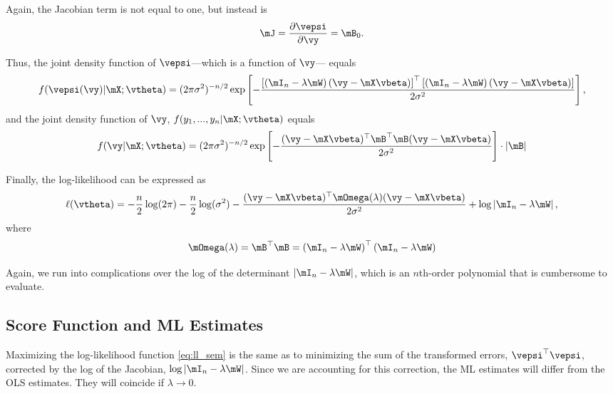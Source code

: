 Again, the Jacobian term is not equal to one, but instead is
\begin{equation*}
\mJ = \frac{\partial \vepsi}{\partial \vy} =\mB_0.
\end{equation*}

Thus, the joint density function of $\vepsi$---which is a function of $\vy$--- equals
\begin{equation*}
  f(\vepsi(\vy)| \mX ; \vtheta) = (2\pi \sigma^2)^{-n/2}\exp\left[- \frac{\left[\left(\mI_n-\lambda\mW\right)(\vy - \mX\vbeta)\right]^\top \left[\left(\mI_n-\lambda\mW\right)(\vy - \mX\vbeta)\right]}{2\sigma^2}\right],
\end{equation*}
%
and the joint density function of $\vy$, $f(y_1,...,y_n|\mX; \vtheta)$ equals
\begin{equation*}
  f(\vy| \mX ; \vtheta) = (2\pi \sigma^2)^{-n/2}\exp\left[- \frac{(\vy - \mX\vbeta)^\top \mB^\top \mB (\vy - \mX\vbeta)}{2\sigma^2}\right]\cdot \left|\mB\right|
\end{equation*}

Finally, the log-likelihood can be expressed as
\begin{equation}\label{eq:ll_sem}
\ell(\vtheta) = - \frac{n}{2}\log(2\pi) - \frac{n}{2}\log(\sigma^2)-\frac{(\vy - \mX\vbeta)^\top \mOmega(\lambda) (\vy - \mX\vbeta)}{2\sigma^2} + \log\left|\mI_n - \lambda \mW\right|,
\end{equation}
%
where 
\begin{equation*}
\mOmega(\lambda) = \mB^\top \mB = \left(\mI_n-\lambda\mW\right)^\top \left(\mI_n-\lambda\mW\right)
\end{equation*}

Again, we run into complications over the log of the determinant $\left|\mI_n - \lambda \mW\right|$, which is an $n$th-order polynomial that is cumbersome to evaluate. 

\subsection{Score Function and ML Estimates}\label{sec:sem_ml_estimates}

Maximizing the log-likelihood function \eqref{eq:ll_sem} is the same as to minimizing the sum of the transformed errors, $\vepsi^\top\vepsi$, corrected by the log of the Jacobian, $\log\left|\mI_n - \lambda \mW\right|$. Since we are accounting for this correction, the ML estimates will differ from the OLS estimates. They will coincide if $\lambda \to 0$. 

